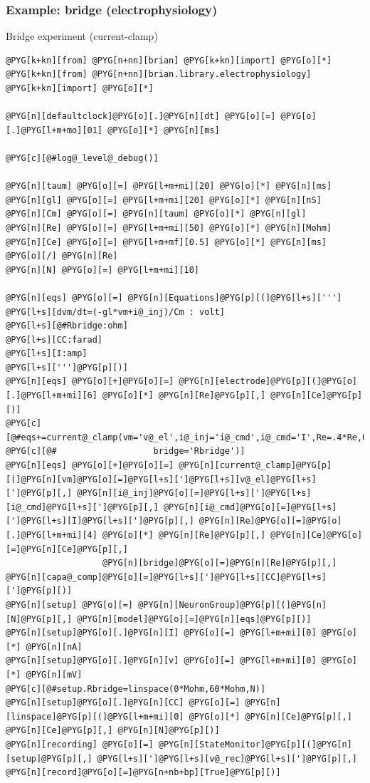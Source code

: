 \documentclass[letterpaper,10pt,english]{manual}
\begin{document}
\hypertarget{index-25}{}\subsubsection{Example: bridge (electrophysiology)}

Bridge experiment (current-clamp)

\begin{Verbatim}[commandchars=@\[\]]
@PYG[k+kn][from] @PYG[n+nn][brian] @PYG[k+kn][import] @PYG[o][*]
@PYG[k+kn][from] @PYG[n+nn][brian.library.electrophysiology] @PYG[k+kn][import] @PYG[o][*]

@PYG[n][defaultclock]@PYG[o][.]@PYG[n][dt] @PYG[o][=] @PYG[o][.]@PYG[l+m+mo][01] @PYG[o][*] @PYG[n][ms]

@PYG[c][@#log@_level@_debug()]

@PYG[n][taum] @PYG[o][=] @PYG[l+m+mi][20] @PYG[o][*] @PYG[n][ms]
@PYG[n][gl] @PYG[o][=] @PYG[l+m+mi][20] @PYG[o][*] @PYG[n][nS]
@PYG[n][Cm] @PYG[o][=] @PYG[n][taum] @PYG[o][*] @PYG[n][gl]
@PYG[n][Re] @PYG[o][=] @PYG[l+m+mi][50] @PYG[o][*] @PYG[n][Mohm]
@PYG[n][Ce] @PYG[o][=] @PYG[l+m+mf][0.5] @PYG[o][*] @PYG[n][ms] @PYG[o][/] @PYG[n][Re]
@PYG[n][N] @PYG[o][=] @PYG[l+m+mi][10]

@PYG[n][eqs] @PYG[o][=] @PYG[n][Equations]@PYG[p][(]@PYG[l+s][''']
@PYG[l+s][dvm/dt=(-gl*vm+i@_inj)/Cm : volt]
@PYG[l+s][@#Rbridge:ohm]
@PYG[l+s][CC:farad]
@PYG[l+s][I:amp]
@PYG[l+s][''']@PYG[p][)]
@PYG[n][eqs] @PYG[o][+]@PYG[o][=] @PYG[n][electrode]@PYG[p][(]@PYG[o][.]@PYG[l+m+mi][6] @PYG[o][*] @PYG[n][Re]@PYG[p][,] @PYG[n][Ce]@PYG[p][)]
@PYG[c][@#eqs+=current@_clamp(vm='v@_el',i@_inj='i@_cmd',i@_cmd='I',Re=.4*Re,Ce=Ce,]
@PYG[c][@#                   bridge='Rbridge')]
@PYG[n][eqs] @PYG[o][+]@PYG[o][=] @PYG[n][current@_clamp]@PYG[p][(]@PYG[n][vm]@PYG[o][=]@PYG[l+s][']@PYG[l+s][v@_el]@PYG[l+s][']@PYG[p][,] @PYG[n][i@_inj]@PYG[o][=]@PYG[l+s][']@PYG[l+s][i@_cmd]@PYG[l+s][']@PYG[p][,] @PYG[n][i@_cmd]@PYG[o][=]@PYG[l+s][']@PYG[l+s][I]@PYG[l+s][']@PYG[p][,] @PYG[n][Re]@PYG[o][=]@PYG[o][.]@PYG[l+m+mi][4] @PYG[o][*] @PYG[n][Re]@PYG[p][,] @PYG[n][Ce]@PYG[o][=]@PYG[n][Ce]@PYG[p][,]
                   @PYG[n][bridge]@PYG[o][=]@PYG[n][Re]@PYG[p][,] @PYG[n][capa@_comp]@PYG[o][=]@PYG[l+s][']@PYG[l+s][CC]@PYG[l+s][']@PYG[p][)]
@PYG[n][setup] @PYG[o][=] @PYG[n][NeuronGroup]@PYG[p][(]@PYG[n][N]@PYG[p][,] @PYG[n][model]@PYG[o][=]@PYG[n][eqs]@PYG[p][)]
@PYG[n][setup]@PYG[o][.]@PYG[n][I] @PYG[o][=] @PYG[l+m+mi][0] @PYG[o][*] @PYG[n][nA]
@PYG[n][setup]@PYG[o][.]@PYG[n][v] @PYG[o][=] @PYG[l+m+mi][0] @PYG[o][*] @PYG[n][mV]
@PYG[c][@#setup.Rbridge=linspace(0*Mohm,60*Mohm,N)]
@PYG[n][setup]@PYG[o][.]@PYG[n][CC] @PYG[o][=] @PYG[n][linspace]@PYG[p][(]@PYG[l+m+mi][0] @PYG[o][*] @PYG[n][Ce]@PYG[p][,] @PYG[n][Ce]@PYG[p][,] @PYG[n][N]@PYG[p][)]
@PYG[n][recording] @PYG[o][=] @PYG[n][StateMonitor]@PYG[p][(]@PYG[n][setup]@PYG[p][,] @PYG[l+s][']@PYG[l+s][v@_rec]@PYG[l+s][']@PYG[p][,] @PYG[n][record]@PYG[o][=]@PYG[n+nb+bp][True]@PYG[p][)]


\end{Verbatim}
\end{document}
